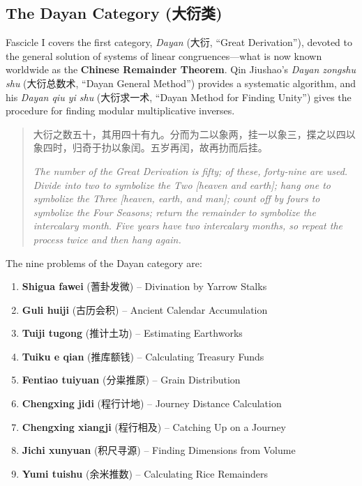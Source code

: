 \documentclass[11pt,a4paper]{article}
\newcommand{\zhtext}[1]{{\chinese #1}}
\begin{document}
\subsection{The Dayan Category (\zhtext{大衍类})}

Fascicle I covers the first category, \textit{Dayan} (\zhtext{大衍}, ``Great Derivation''), devoted to the general solution of systems of linear congruences---what is now known worldwide as the \textbf{Chinese Remainder Theorem}. Qin Jiushao's \textit{Dayan zongshu shu} (\zhtext{大衍总数术}, ``Dayan General Method'') provides a systematic algorithm, and his \textit{Dayan qiu yi shu} (\zhtext{大衍求一术}, ``Dayan Method for Finding Unity'') gives the procedure for finding modular multiplicative inverses.

\begin{quote}
\zhtext{大衍之数五十，其用四十有九。分而为二以象两，挂一以象三，揲之以四以象四时，归奇于扐以象闰。五岁再闰，故再扐而后挂。}

\textit{The number of the Great Derivation is fifty; of these, forty-nine are used. Divide into two to symbolize the Two [heaven and earth]; hang one to symbolize the Three [heaven, earth, and man]; count off by fours to symbolize the Four Seasons; return the remainder to symbolize the intercalary month. Five years have two intercalary months, so repeat the process twice and then hang again.}
\end{quote}

The nine problems of the Dayan category are:
\begin{enumerate}[label=\arabic*.]
  \item \textbf{Shigua fawei} (\zhtext{蓍卦发微}) -- Divination by Yarrow Stalks
  \item \textbf{Guli huiji} (\zhtext{古历会积}) -- Ancient Calendar Accumulation
  \item \textbf{Tuiji tugong} (\zhtext{推计土功}) -- Estimating Earthworks
  \item \textbf{Tuiku e qian} (\zhtext{推库额钱}) -- Calculating Treasury Funds
  \item \textbf{Fentiao tuiyuan} (\zhtext{分粜推原}) -- Grain Distribution
  \item \textbf{Chengxing jidi} (\zhtext{程行计地}) -- Journey Distance Calculation
  \item \textbf{Chengxing xiangji} (\zhtext{程行相及}) -- Catching Up on a Journey
  \item \textbf{Jichi xunyuan} (\zhtext{积尺寻源}) -- Finding Dimensions from Volume
  \item \textbf{Yumi tuishu} (\zhtext{余米推数}) -- Calculating Rice Remainders
\end{enumerate}
\end{document}
